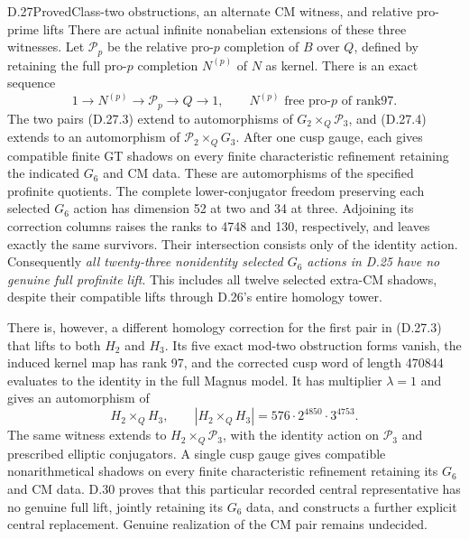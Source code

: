 \begin{statement}{D.27}{Proved}{Class-two obstructions, an alternate CM witness, and relative pro-prime lifts}
There are actual infinite nonabelian extensions of these
three witnesses. Let $\mathcal P_p$ be the relative pro-$p$
completion of $B$ over $Q$, defined by retaining the full
pro-$p$ completion $N^{(p)}$ of $N$ as kernel. There is an
exact sequence
\[
 1\longrightarrow N^{(p)}\longrightarrow\mathcal P_p
 \longrightarrow Q\longrightarrow1,
 \qquad N^{(p)}\text{ free pro-}p\text{ of rank97}.        \tag{D.27.5}
\]
The two pairs (D.27.3) extend to automorphisms of
$G_2\times_Q\mathcal P_3$, and (D.27.4) extends to an
automorphism of $\mathcal P_2\times_QG_3$.
After one cusp gauge, each gives compatible finite GT
shadows on every finite characteristic refinement retaining
the indicated $G_6$ and CM data.
These are automorphisms of the specified profinite quotients.
The complete lower-conjugator freedom preserving each selected
$G_6$ action has dimension 52 at two and 34 at three.
Adjoining its correction columns raises the ranks to 4748
and 130, respectively, and leaves exactly the same survivors.
Their intersection consists only of the identity action.
Consequently \emph{all twenty-three nonidentity selected
$G_6$ actions in D.25 have no genuine full profinite lift}.
This includes all twelve selected extra-CM shadows, despite
their compatible lifts through D.26's entire homology tower.

There is, however, a different homology correction for the
first pair in (D.27.3) that lifts to both $H_2$ and $H_3$.
Its five exact mod-two obstruction forms vanish, the induced
kernel map has rank 97, and the corrected cusp word of length
470844 evaluates to the identity in the full Magnus model.
It has multiplier $\lambda=1$ and gives an automorphism of
\[
 H_2\times_Q H_3,
 \qquad |H_2\times_Q H_3|=576\cdot2^{4850}\cdot3^{4753}.
                                                               \tag{D.27.9}
\]
The same witness extends to $H_2\times_Q\mathcal P_3$,
with the identity action on $\mathcal P_3$ and prescribed
elliptic conjugators. A single cusp gauge gives compatible
nonarithmetical shadows on every finite characteristic
refinement retaining its $G_6$ and CM data. D.30 proves
that this particular recorded central representative has
no genuine full lift, jointly retaining its $G_6$ data,
and constructs a further explicit central replacement.
Genuine realization of the CM pair remains undecided.
\end{statement}
